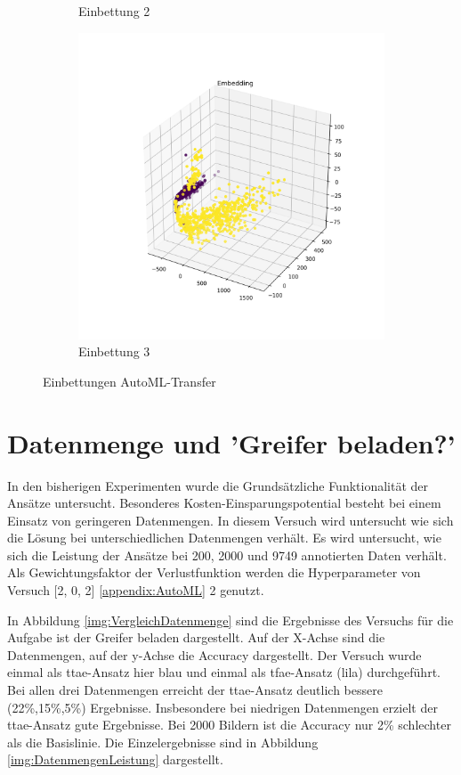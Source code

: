 \begin{figure}[h]
\begin{subfigure}[c]{0.32\textwidth}
			\caption{Einbettung 2}
			\label{img:AutoMLEinbettungV2}	
		\end{subfigure}
		\begin{subfigure}[c]{0.32\textwidth}			
			\includegraphics[width=1\textwidth, center]{src/AutoML/3/Embedding.png}
			\caption{Einbettung 3}
			\label{img:AutoMLEinbettungV3}	
		\end{subfigure}
		\caption{Einbettungen AutoML-Transfer}
		\label{img:EmbeddingAutoMLTransfer}
	\end{figure}
	
	
	\section{Datenmenge und 'Greifer beladen?'}
	\label{sec:TransferDatenmenge}
	In den bisherigen Experimenten wurde die Grundsätzliche Funktionalität der Ansätze untersucht. Besonderes  Kosten-Einsparungspotential besteht bei einem Einsatz von geringeren Datenmengen. In diesem Versuch wird untersucht wie sich die Lösung bei unterschiedlichen Datenmengen verhält. Es wird untersucht, wie sich die Leistung der Ansätze bei 200, 2000 und 9749 annotierten Daten verhält. Als Gewichtungsfaktor der Verlustfunktion werden die Hyperparameter von Versuch [2, 0, 2] \ref{appendix:AutoML} 2 genutzt. 
	
	In Abbildung \ref{img:VergleichDatenmenge} sind die Ergebnisse des Versuchs für die Aufgabe ist der Greifer beladen dargestellt. Auf der X-Achse sind die Datenmengen, auf der y-Achse die Accuracy dargestellt. Der Versuch wurde einmal als \ac{ttae}-Ansatz hier blau und einmal als \ac{tfae}-Ansatz (lila) durchgeführt. Bei allen drei Datenmengen erreicht der \ac{ttae}-Ansatz deutlich bessere (22\%,15\%,5\%) Ergebnisse. Insbesondere bei niedrigen Datenmengen erzielt der \ac{ttae}-Ansatz gute Ergebnisse. Bei 2000 Bildern ist die Accuracy nur 2\% schlechter als die Basislinie. Die Einzelergebnisse sind in Abbildung \ref{img:DatenmengenLeistung} dargestellt.   
	
